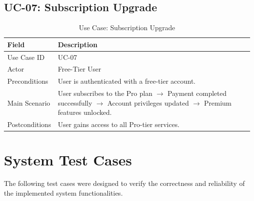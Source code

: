 \subsection{UC-07: Subscription Upgrade}

\begin{table}[H]
\centering
\caption{Use Case: Subscription Upgrade}
\renewcommand{\arraystretch}{1.4}
\begin{tabularx}{\textwidth}{l X}
\toprule
\textbf{Field} & \textbf{Description}\\
\midrule
Use Case ID & UC-07\\
Actor & Free-Tier User\\
Preconditions & User is authenticated with a free-tier account.\\
Main Scenario &
User subscribes to the Pro plan $\rightarrow$
Payment completed successfully $\rightarrow$
Account privileges updated $\rightarrow$
Premium features unlocked.\\
Postconditions &
User gains access to all Pro-tier services.\\
\bottomrule
\end{tabularx}
\end{table}

\section{System Test Cases}
\label{sec:test_cases}

The following test cases were designed to verify the correctness and reliability of the implemented system functionalities.

